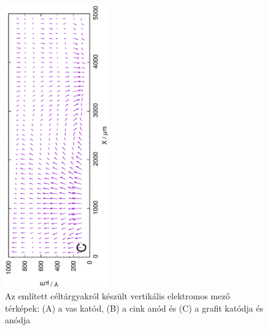 \begin{figure}
\includegraphics[width=0.4\textwidth, angle=-90]{img/mérések/grafit1_v.eps}

\caption{Az említett céltárgyakról készült vertikális elektromos mező térképek:
(A) a vas katód, (B) a cink anód és (C) a grafit katódja és anódja}
\label{fig:field_v}
\end{figure}

